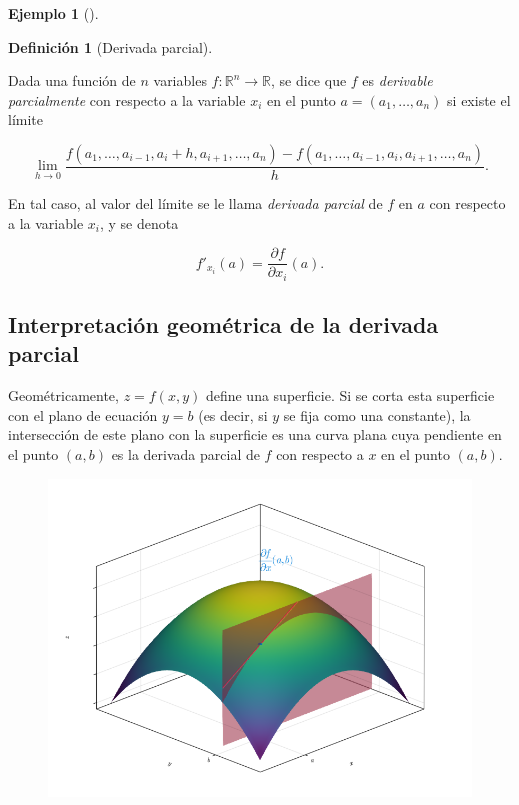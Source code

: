 \documentclass[
  a4paper,
]{scrreport}
\theoremstyle{definition}
\newtheorem{example}{Ejemplo}[chapter]
\theoremstyle{plain}
\theoremstyle{definition}
\newtheorem{definition}{Definición}[chapter]
\theoremstyle{definition}
\theoremstyle{plain}
\theoremstyle{plain}
\theoremstyle{remark}
\begin{document}
\begin{example}[]
\begin{definition}[Derivada
parcial]\protect\hypertarget{def-derivada-parcial}{}\label{def-derivada-parcial}

Dada una función de \(n\) variables
\(f:\mathbb{R}^n\rightarrow \mathbb{R}\), se dice que \(f\) es
\emph{derivable parcialmente} con respecto a la variable \(x_i\) en el
punto \(a=(a_1,\ldots,a_n)\) si existe el límite

\[
\lim_{h\rightarrow 0} \frac{f(a_1,\ldots,a_{i-1},a_i+h,a_{i+1},\ldots,a_n)-f(a_1,\ldots,a_{i-1},a_i,a_{i+1},\ldots,a_n)} {h}.
\]

En tal caso, al valor del límite se le llama \emph{derivada parcial} de
\(f\) en \(a\) con respecto a la variable \(x_i\), y se denota

\[
f'_{x_i}(a)=\frac{\partial f}{\partial x_i}(a).
\]

\end{definition}

\subsection{Interpretación geométrica de la derivada
parcial}\label{interpretaciuxf3n-geomuxe9trica-de-la-derivada-parcial}

Geométricamente, \(z=f(x,y)\) define una superficie. Si se corta esta
superficie con el plano de ecuación \(y=b\) (es decir, si \(y\) se fija
como una constante), la intersección de este plano con la superficie es
una curva plana cuya pendiente en el punto \((a,b)\) es la derivada
parcial de \(f\) con respecto a \(x\) en el punto \((a,b)\).

\begin{figure}[H]

{\centering \includegraphics{./img/derivadas-funciones-varias-variables/derivada-parcial-x.png}

}
\end{figure}
\end{example}
\end{document}
